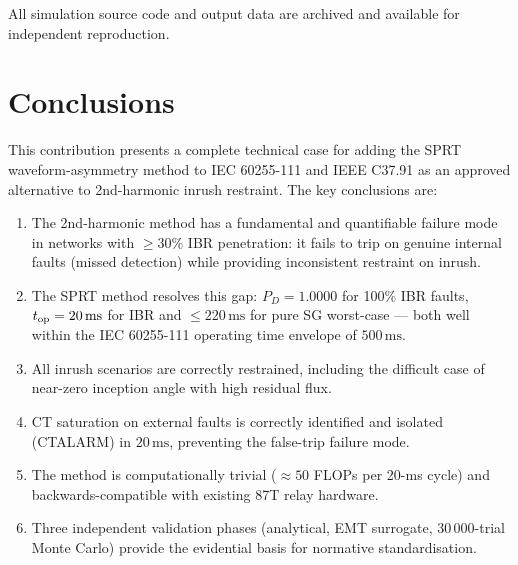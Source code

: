 \documentclass[11pt, a4paper]{article}
\newcommand{\ms}{\,\text{ms}}
\begin{document}
All simulation source code and output data are archived and available for
independent reproduction.

\section{Conclusions}

This contribution presents a complete technical case for adding the SPRT
waveform-asymmetry method to IEC 60255-111 and IEEE C37.91 as an approved
alternative to 2nd-harmonic inrush restraint.  The key conclusions are:

\begin{enumerate}
  \item The 2nd-harmonic method has a fundamental and quantifiable failure
    mode in networks with $\geq 30\%$ IBR penetration: it fails to trip on
    genuine internal faults (missed detection) while providing inconsistent
    restraint on inrush.

  \item The SPRT method resolves this gap: $P_D = 1.0000$ for 100\% IBR
    faults, $t_{\rm op} = 20\ms$ for IBR and $\leq 220\ms$ for pure SG
    worst-case — both well within the IEC 60255-111 operating time envelope
    of $500\ms$.

  \item All inrush scenarios are correctly restrained, including the
    difficult case of near-zero inception angle with high residual flux.

  \item CT saturation on external faults is correctly identified and
    isolated (CTALARM) in $20\ms$, preventing the false-trip failure mode.

  \item The method is computationally trivial ($\approx 50$ FLOPs per
    20-ms cycle) and backwards-compatible with existing 87T relay hardware.

  \item Three independent validation phases (analytical, EMT surrogate,
    30\,000-trial Monte Carlo) provide the evidential basis for
    normative standardisation.
\end{enumerate}



\end{document}
